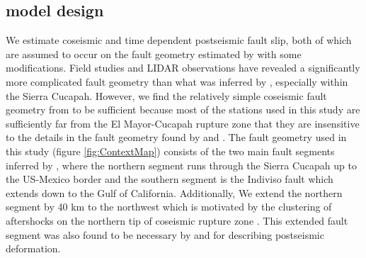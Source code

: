 \documentclass[12pt]{article}
\begin{document}
\subsection*{model design}
We estimate coseismic and time dependent postseismic fault slip, both of which are assumed to occur on the fault geometry estimated by \cite{Wei2011} with some modifications.  Field studies \cite{Fletcher2014} and LIDAR observations \cite{Oskin2012} have revealed a significantly more complicated fault geometry than what was inferred by \cite{Wei2011}, especially within the Sierra Cucapah.  However, we find the relatively simple coseismic fault geometry from \cite{Wei2011a} to be sufficient because most of the stations used in this study are sufficiently far from the El Mayor-Cucapah rupture zone that they are insensitive to the details in the fault geometry found by \cite{Fletcher2014} and \cite{Oskin2012}.  The fault geometry used in this study (figure \ref{fig:ContextMap}) consists of the two main fault segments inferred by \cite{Wei2011}, where the northern segment runs through the Sierra Cucapah up to the US-Mexico border and the southern segment is the Indiviso fault which extends down to the Gulf of California.  Additionally, We extend the northern segment by 40 km to the northwest which is motivated by the clustering of aftershocks on the northern tip of coseismic rupture zone \cite{Kroll2013} \cite{Hauksson2011}.  This extended fault segment was also found to be necessary by \cite{Rollins2015} and \cite{Pollitz2012} for describing postseismic deformation.     
\end{document}
